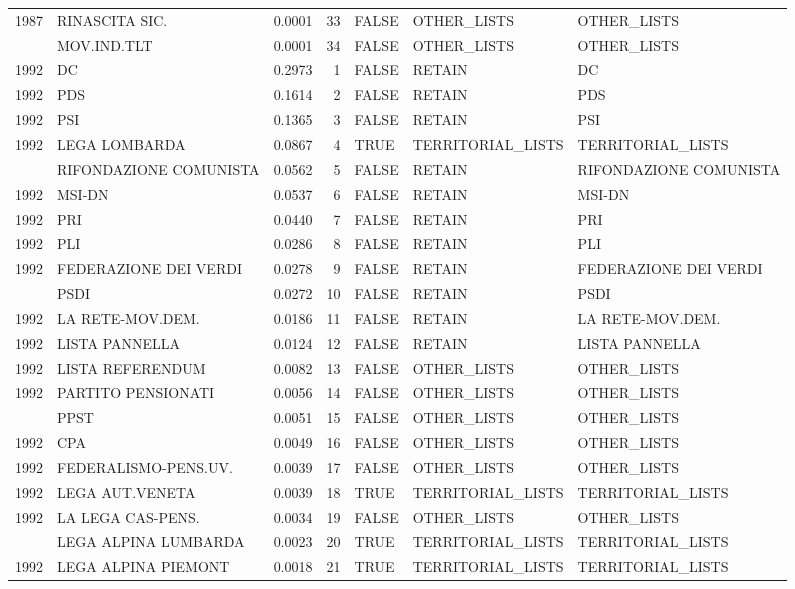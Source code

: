 \begin{longtable}[t]{rlrrlll}
1987 & RINASCITA SIC. & 0.0001 & 33 & FALSE & OTHER\_LISTS & OTHER\_LISTS\\
\addlinespace
1987 & MOV.IND.TLT & 0.0001 & 34 & FALSE & OTHER\_LISTS & OTHER\_LISTS\\
1992 & DC & 0.2973 & 1 & FALSE & RETAIN & DC\\
1992 & PDS & 0.1614 & 2 & FALSE & RETAIN & PDS\\
1992 & PSI & 0.1365 & 3 & FALSE & RETAIN & PSI\\
1992 & LEGA LOMBARDA & 0.0867 & 4 & TRUE & TERRITORIAL\_LISTS & TERRITORIAL\_LISTS\\
\addlinespace
1992 & RIFONDAZIONE COMUNISTA & 0.0562 & 5 & FALSE & RETAIN & RIFONDAZIONE COMUNISTA\\
1992 & MSI-DN & 0.0537 & 6 & FALSE & RETAIN & MSI-DN\\
1992 & PRI & 0.0440 & 7 & FALSE & RETAIN & PRI\\
1992 & PLI & 0.0286 & 8 & FALSE & RETAIN & PLI\\
1992 & FEDERAZIONE DEI VERDI & 0.0278 & 9 & FALSE & RETAIN & FEDERAZIONE DEI VERDI\\
\addlinespace
1992 & PSDI & 0.0272 & 10 & FALSE & RETAIN & PSDI\\
1992 & LA RETE-MOV.DEM. & 0.0186 & 11 & FALSE & RETAIN & LA RETE-MOV.DEM.\\
1992 & LISTA PANNELLA & 0.0124 & 12 & FALSE & RETAIN & LISTA PANNELLA\\
1992 & LISTA REFERENDUM & 0.0082 & 13 & FALSE & OTHER\_LISTS & OTHER\_LISTS\\
1992 & PARTITO PENSIONATI & 0.0056 & 14 & FALSE & OTHER\_LISTS & OTHER\_LISTS\\
\addlinespace
1992 & PPST & 0.0051 & 15 & FALSE & OTHER\_LISTS & OTHER\_LISTS\\
1992 & CPA & 0.0049 & 16 & FALSE & OTHER\_LISTS & OTHER\_LISTS\\
1992 & FEDERALISMO-PENS.UV. & 0.0039 & 17 & FALSE & OTHER\_LISTS & OTHER\_LISTS\\
1992 & LEGA AUT.VENETA & 0.0039 & 18 & TRUE & TERRITORIAL\_LISTS & TERRITORIAL\_LISTS\\
1992 & LA LEGA CAS-PENS. & 0.0034 & 19 & FALSE & OTHER\_LISTS & OTHER\_LISTS\\
\addlinespace
1992 & LEGA ALPINA LUMBARDA & 0.0023 & 20 & TRUE & TERRITORIAL\_LISTS & TERRITORIAL\_LISTS\\
1992 & LEGA ALPINA PIEMONT & 0.0018 & 21 & TRUE & TERRITORIAL\_LISTS & TERRITORIAL\_LISTS\\

\end{longtable}

